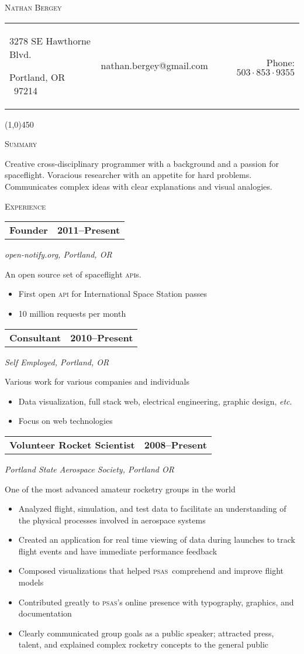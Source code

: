 \documentclass[letterpaper,10pt]{article}
\makeatletter
\newcommand{\me}      {Nathan Bergey}
\newcommand{\email}   {nathan.bergey@gmail.com}
\newcommand{\address} {\begin{minipage}{2in}\raggedright3278 SE Hawthorne Blvd.\par Portland, OR \ 97214\end{minipage}}
\newcommand{\phone}   {$503\cdot853\cdot9355$}
\newcommand{\PSAS}{\textsc{psas}}
\newcommand{\resumepageheader}{
  \begin{center}
    {\LARGE{\textsc{\me}}}

    \vspace{0.2in}

    \begin{tabular*}{6.5in}{l c@{\extracolsep{\fill}} r}
      \address & \email & Phone: \phone \\
    \end{tabular*}
    
    \vspace{0.02in}

    \line(1,0){450}
  \end{center}
}
\newcommand{\resumestatement}[1]{
  \vspace{0.05in}
  \textsc{\Large Summary}
  \vspace{0.1in}
  \begin{center}
    \begin{minipage}{5.5in}
      \small
      #1
    \end{minipage}
  \end{center}
}
\newcommand{\resumeheader}[1]{
  \vspace{0.08in}
  \textsc{\Large #1}
  \vspace{0.10in}
}
\newcommand{\resumeitem}[4]{
  {\addtolength{\leftskip}{0.21in}
    \begin{tabular*}{6.25in}{l@{\extracolsep{\fill}} r}
      {\textbf{#1}} & {\textbf{#2}} \\
    \end{tabular*}
    
  }
  
  \vspace{0.01in}
  {\addtolength{\leftskip}{0.3in}
    \textit{#3}\par
  }
  
  \vspace{0.07in}
  {\addtolength{\leftskip}{0.3in}
    \small
    \begin{minipage}{5in}
      #4
    \end{minipage}
    
  }
  \vspace{0.15in}
}
\makeatother
\begin{document}
\resumepageheader

\resumestatement{
                  Creative cross-disciplinary programmer with a background 
                  and a passion for spaceflight. Voracious researcher with an 
                  appetite for hard problems. Communicates complex ideas with 
                  clear explanations and visual analogies.
                }

\resumeheader{Experience}
           
\resumeitem{Founder}{2011--Present}%
           {open-notify.org, Portland, OR}%
           {
              An open source set of spaceflight \textsc{api}s.
              \begin{itemize}[topsep=1pt, itemsep=0pt, parsep=0pt]
                \renewcommand{\labelitemi}{---}
                \item First open \textsc{api} for International Space Station passes
                \item 10 million requests per month
              \end{itemize}
           }

\resumeitem{Consultant}{2010--Present}%
           {Self Employed, Portland, OR}%
           {
              Various work for various companies and individuals
              \begin{itemize}[topsep=1pt, itemsep=0pt, parsep=0pt]
                \renewcommand{\labelitemi}{---}
                \item Data visualization, full stack web, electrical engineering, graphic design, \textit{etc}.
                \item Focus on web technologies
              \end{itemize}
           }

\resumeitem{Volunteer Rocket Scientist}{2008--Present}%
           {Portland State Aerospace Society, Portland OR}%
           {
              One of the most advanced amateur rocketry groups in the world
              \begin{itemize}[topsep=1pt, itemsep=0pt, parsep=0pt]
                \renewcommand{\labelitemi}{---}
                \item Analyzed flight, simulation, and test data to facilitate an understanding of the physical processes involved in aerospace systems
                \item Created an application for real time viewing of data during launches to track flight events and have immediate performance feedback
                \item Composed visualizations that helped \PSAS\ comprehend and improve flight models
                \item Contributed greatly to \PSAS's online presence with typography, graphics, and documentation
                \item Clearly communicated group goals as a public speaker; attracted press, talent, and explained complex rocketry concepts to the general public
              \end{itemize}
           }
\end{document}
